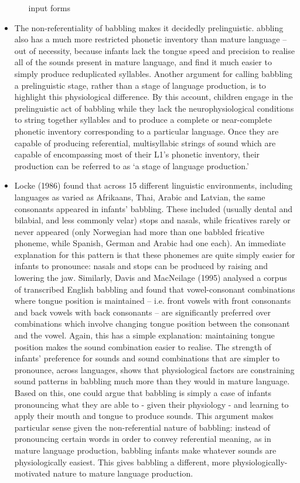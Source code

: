 \documentclass{article}
\begin{document}
\begin{itemize}
\begin{itemize}
        input forms
    \end{itemize}
    \item The non-referentiality of babbling makes it decidedly prelinguistic. abbling also has a much more restricted phonetic inventory than mature language – out of necessity, because infants lack the tongue speed and precision to realise all of the sounds present in mature language, and find it much easier to simply produce reduplicated syllables. Another argument for calling babbling a prelinguistic stage, rather than a stage of language production, is to highlight this physiological difference. By this account, children engage in the prelinguistic act of babbling while they lack the neurophysiological conditions to string together syllables and to produce a complete or near-complete phonetic inventory corresponding to a particular language. Once they are capable of producing referential, multisyllabic strings of sound which are capable of encompassing most of their L1’s phonetic inventory, their production can be referred to as ‘a stage of language production.’
    \item Locke (1986) found that across 15 different linguistic environments, including languages as varied as Afrikaans, Thai, Arabic and Latvian, the same consonants appeared in infants’ babbling. These included (usually dental and bilabial, and less commonly velar) stops and nasals, while fricatives rarely or never appeared (only Norwegian had more than one babbled fricative phoneme, while Spanish, German and Arabic had one each). An immediate explanation for this pattern is that these phonemes are quite simply easier for infants to pronounce: nasals and stops can be produced by raising and lowering the jaw. Similarly, Davis and MacNeilage (1995) analysed a corpus of transcribed English babbling and found that vowel-consonant combinations where tongue position is maintained – i.e. front vowels with front consonants and back vowels with back consonants – are significantly preferred over combinations which involve changing tongue position between the consonant and the vowel. Again, this has a simple explanation: maintaining tongue position makes the sound combination easier to realise. The strength of infants’ preference for sounds and sound combinations that are simpler to pronounce, across languages, shows that physiological factors are constraining sound patterns in babbling much more than they would in mature language. Based on this, one could argue that babbling is simply a case of infants pronouncing what they are able to - given their physiology - and learning to apply their mouth and tongue to produce sounds. This argument makes particular sense given the non-referential nature of babbling: instead of pronouncing certain words in order to convey referential meaning, as in mature language production, babbling infants make whatever sounds are physiologically easiest. This gives babbling a different, more physiologically-motivated nature to mature language production.

\end{itemize}
\end{document}
